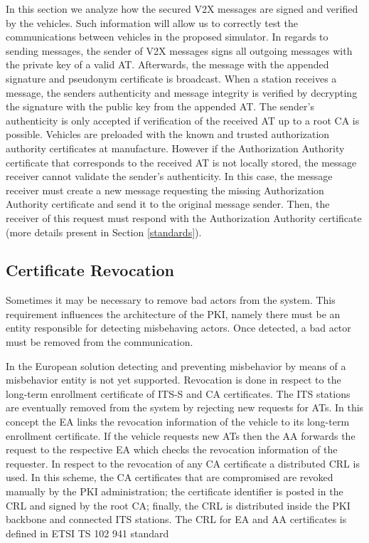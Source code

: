 In this section we analyze how the secured V2X messages are signed and verified by the vehicles. Such information will allow us to correctly test the communications between vehicles in the proposed simulator. In regards to sending messages, the sender of V2X messages signs all outgoing messages with the private key of a valid AT. Afterwards, the message with the appended signature and pseudonym certificate is broadcast. When a station receives a message, the senders authenticity and message integrity is verified by decrypting the signature with the public key from the appended AT. The sender's authenticity is only accepted if verification of the received AT up to a root CA is possible. Vehicles are preloaded with the known and trusted authorization authority certificates at manufacture. However if the Authorization Authority certificate that corresponds to the received AT is not locally stored, the message receiver cannot validate the sender's authenticity. In this case, the message receiver must create a new message requesting the missing Authorization Authority certificate and send it to the original message sender. Then, the receiver of this request must respond with the Authorization Authority certificate (more details present in Section \ref{standards}).

\subsection{Certificate Revocation}

Sometimes it may be necessary to remove bad actors from the system. This requirement influences the architecture of the PKI, namely there must be an entity responsible for detecting misbehaving actors. Once detected, a bad actor must be removed from the communication. 

In the European solution detecting and preventing misbehavior by means of a misbehavior entity is not yet supported. Revocation is done in respect to the long-term enrollment certificate of ITS-S and CA certificates. The ITS stations are eventually removed from the system by rejecting new requests for ATs. In this concept the EA links the revocation information of the vehicle to its long-term enrollment certificate. If the vehicle requests new ATs then the AA forwards the request to the respective EA which checks the revocation information of the requester. In respect to the revocation of any CA certificate a distributed CRL is used. In this scheme, the CA certificates that are compromised are revoked manually by the PKI administration; the certificate identifier is posted in the CRL and signed by the root CA; finally, the CRL is distributed inside the PKI backbone and connected ITS stations. The CRL for EA and AA certificates is defined in ETSI TS 102 941 \cite{etsi_privacy} standard

